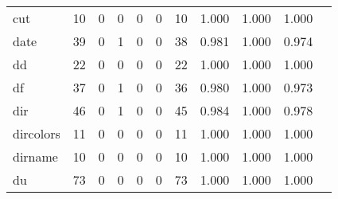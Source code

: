 \begin{longtable}{lp{1.10cm}p{1.10cm}p{1.10cm}p{1.10cm}p{1.10cm}p{1.10cm}p{1.10cm}p{1.10cm}p{1.10cm}p{1.10cm}}
cut       &                     10 &                                  0 &                                 0 &                                0 &                                 0 &                              10 &                          1.000 &                                 1.000 &                               1.000 \\
date      &                     39 &                                  0 &                                 1 &                                0 &                                 0 &                              38 &                          0.981 &                                 1.000 &                               0.974 \\
dd        &                     22 &                                  0 &                                 0 &                                0 &                                 0 &                              22 &                          1.000 &                                 1.000 &                               1.000 \\
df        &                     37 &                                  0 &                                 1 &                                0 &                                 0 &                              36 &                          0.980 &                                 1.000 &                               0.973 \\
dir       &                     46 &                                  0 &                                 1 &                                0 &                                 0 &                              45 &                          0.984 &                                 1.000 &                               0.978 \\
dircolors &                     11 &                                  0 &                                 0 &                                0 &                                 0 &                              11 &                          1.000 &                                 1.000 &                               1.000 \\
dirname   &                     10 &                                  0 &                                 0 &                                0 &                                 0 &                              10 &                          1.000 &                                 1.000 &                               1.000 \\
du        &                     73 &                                  0 &                                 0 &                                0 &                                 0 &                              73 &                          1.000 &                                 1.000 &                               1.000 \\

\end{longtable}
